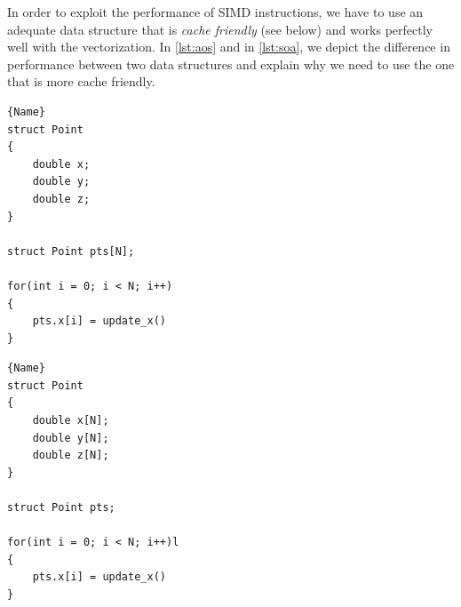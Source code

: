 In order to exploit the performance of SIMD instructions, we have to use an adequate data structure that is \emph{cache friendly} (see below) and works perfectly well with the vectorization. In \autoref{lst:aos} and in \autoref{lst:soa}, we depict the difference in performance between two data structures and explain why we need to use the one that is more cache friendly.


\begin{minipage}{.45\textwidth}
\begin{lstlisting}[caption=Array of Structures (AoS),frame=tlrb, label=lst:aos]{Name}
struct Point
{
    double x;
    double y;
    double z;
}

struct Point pts[N];

for(int i = 0; i < N; i++)
{
    pts.x[i] = update_x()
}
\end{lstlisting}
\end{minipage}\hfill
\begin{minipage}{.45\textwidth}
\begin{lstlisting}[caption=Structure of Arrays (SoA),frame=tlrb, label=lst:soa]{Name}
struct Point
{
    double x[N];
    double y[N];
    double z[N];
}

struct Point pts;

for(int i = 0; i < N; i++)l
{
    pts.x[i] = update_x()
}

\end{lstlisting}
\end{minipage}

